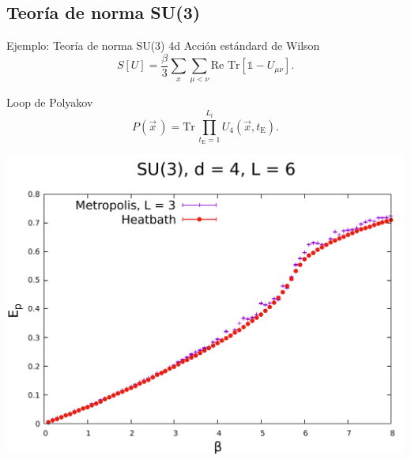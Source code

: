 \documentclass[11pt]{beamer}
\begin{document}
%
%

\subsection{Teoría de norma SU(3)}
\begin{frame}{Ejemplo: Teoría de norma SU(3) 4d}
Acción estándard de Wilson
$$ S[U] = \frac{\beta}{3}\sum_{x}\sum_{\mu < \nu} \text{Re Tr} \left[\mathds{1} - U_{\mu\nu} \right].$$

Loop de Polyakov
$$ P(\vec{x}\,) = \text{Tr}\,\prod_{t_\text{E}=1}^{L_t}U_4(\vec{x},t_\text{E}).$$
\end{frame}

\begin{frame}
\begin{center}
\includegraphics[scale=0.3]{figures/L=6_heatbath_L=3_metropolis.pdf}
\end{center}
\end{frame}
\end{document}
